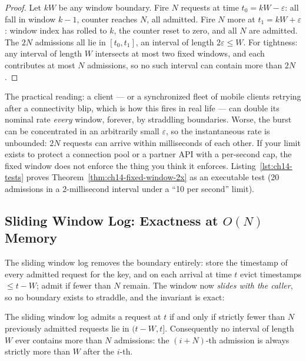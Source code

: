 \begin{proof}
Let $kW$ be any window boundary. Fire $N$ requests at time
$t_0 = kW - \varepsilon$: all fall in window $k-1$, counter reaches $N$,
all admitted. Fire $N$ more at $t_1 = kW + \varepsilon$: window index has
rolled to $k$, the counter reset to zero, and all $N$ are admitted. The
$2N$ admissions all lie in $[t_0, t_1]$, an interval of length
$2\varepsilon \le W$. For tightness: any interval of length $W$ intersects
at most two fixed windows, and each contributes at most $N$ admissions, so
no such interval can contain more than $2N$.
\end{proof}

The practical reading: a client --- or a synchronized fleet of mobile
clients retrying after a connectivity blip, which is how this fires in real
life --- can double its nominal rate \emph{every} window, forever, by
straddling boundaries. Worse, the burst can be concentrated in an
arbitrarily small $\varepsilon$, so the instantaneous rate is unbounded:
$2N$ requests can arrive within milliseconds of each other. If your limit
exists to protect a connection pool or a partner API with a per-second
cap, the fixed window does not enforce the thing you think it enforces.
Listing~\ref{lst:ch14-tests} proves Theorem~\ref{thm:ch14-fixed-window-2x}
as an executable test (20 admissions in a 2-millisecond interval under a
``10 per second'' limit).

\subsection{Sliding Window Log: Exactness at $O(N)$ Memory}
\label{subsec:ch14-sliding-log}

The sliding window log removes the boundary entirely: store the timestamp
of every admitted request for the key, and on each arrival at time $t$
evict timestamps $\le t - W$; admit if fewer than $N$ remain. The window
now \emph{slides with the caller}, so no boundary exists to straddle, and
the invariant is exact:

\begin{proposition}
\label{prop:ch14-swl-exact}
The sliding window log admits a request at $t$ if and only if strictly
fewer than $N$ previously admitted requests lie in $(t-W, t]$. Consequently
no interval of length $W$ ever contains more than $N$ admissions: the
$(i{+}N)$-th admission is always strictly more than $W$ after the $i$-th.
\end{proposition}

